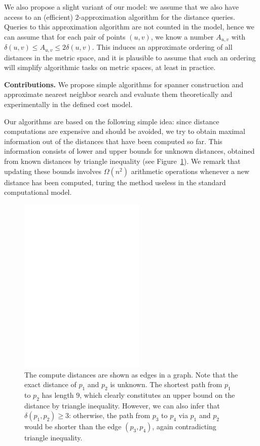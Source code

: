 \documentclass[a4paper,USenglish]{socg-lipics-v2018}
\newcommand{\dist}{\delta}
\newcommand{\myparagraph}[1]{\textbf{#1.}}
\begin{document}
We also propose a slight variant of our model: we assume that we also have access to an (efficient)
$2$-approximation algorithm for the distance queries. Queries to this approximation algorithm
are not counted in the model, hence we can assume that for each pair of points $(u,v)$, we
know a number $A_{u,v}$ with $\dist(u,v)\leq A_{u,v}\leq 2\dist(u,v)$. This induces an approximate ordering
of all distances in the metric space, and it is plausible to assume that such an ordering will simplify
algorithmic tasks on metric spaces, at least in practice.

\myparagraph{Contributions}
%
We propose simple algorithms for spanner construction and approximate nearest neighbor search
and evaluate them theoretically and experimentally in the defined cost model.

Our algorithms are based on the following simple idea: since distance computations are expensive
and should be avoided, we try to obtain maximal information out of the distances that have been computed
so far. 
This information consists of lower and upper bounds for unknown distances, obtained from known distances
by triangle inequality (see Figure~\ref{fig:1st_example}). We remark that updating these bounds involves $\Omega(n^2)$ arithmetic
operations whenever a new distance has been computed, turing the method useless in the standard computational model.

\begin{figure}[h]
\centering
\includegraphics[width=6cm]{intro_example.eps}
\caption{The compute distances are shown as edges in a graph. Note that the exact distance
of $p_1$ and $p_2$ is unknown. The shortest path from $p_1$ to $p_2$ has length $9$, which clearly
constitutes an upper bound on the distance by triangle inequality.
However, we can also infer that $\dist(p_1,p_2)\geq 3$:
otherwise, the path from $p_3$ to $p_4$ via $p_1$ and $p_2$
would be shorter than the edge $(p_3,p_4)$, again contradicting
triangle inequality.}
\label{fig:1st_example}
\end{figure}
\end{document}
